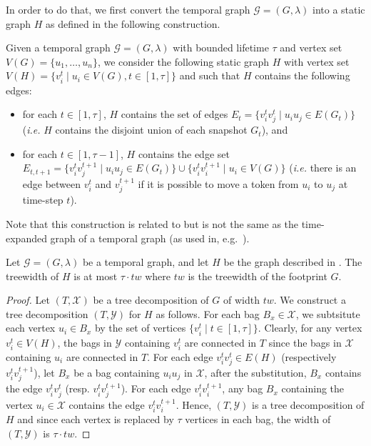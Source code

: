 In order to do that, we first convert the temporal graph $\mathcal{G}=(G,\lambda)$ into a static graph $H$ as defined in the following construction.



\begin{construction}
  \label{const:sliding}
  Given a temporal graph $\mathcal{G}=(G,\lambda)$ with bounded lifetime $\tau$ and vertex set $V(G) = \{u_1,\dots,u_n\}$, we consider the following static graph $H$ with vertex set $V(H) = \{ v^t_i \mid u_i \in V(G), t \in [1,\tau]\}$ and such that $H$ contains the following edges:%
  \begin{itemize}
    \item for each $t \in [1,\tau]$, $H$ contains the set of edges $E_t = \{ v^t_iv^t_j \mid u_iu_j \in E(G_t)\}$ (\textit{i.e.} $H$ contains the disjoint union of each snapshot $G_t$), and
    \item for each $t \in [1,\tau-1]$, $H$ contains the edge set $E_{t,t+1} = \{v^t_iv^{t+1}_j \mid u_iu_j \in E(G_t)\} \cup \{v^t_iv^{t+1}_i \mid u_i \in V(G)\}$ (\textit{i.e.} there is an edge between $v^t_i$ and $v^{t+1}_j$ if it is possible to move a token from $u_i$ to $u_j$ at time-step $t$).  
  \end{itemize}
\end{construction}
Note that this construction is related to but is not the same as the time-expanded graph of a temporal graph (as used in, e.g.~\cite{fluschnik_as_2020}).

\begin{lemmarep}
Let $\mathcal{G}=(G,\lambda)$ be a temporal graph, and let $H$ be the graph described in . The treewidth of $H$ is at most $\tau\cdot tw$ where $tw$ is the treewidth of the footprint $G$.
\end{lemmarep}
\begin{proof}
  Let $(T,\mathcal{X})$ be a tree decomposition of $G$ of width $tw$. We construct a tree decomposition $(T,\mathcal{Y})$ for $H$ as follows. For each bag $B_x \in \mathcal{X}$, we subtsitute each vertex $u_i \in B_x$ by the set of vertices $\{v^t_i \mid t \in [1,\tau]\}$. Clearly, for any vertex $v^t_i \in V(H)$, the bags in $\mathcal{Y}$ containing $v^t_i$ are connected in $T$ since the bags in $\mathcal{X}$ containing $u_i$ are connected in $T$.
For each edge $v^t_iv^t_j \in E(H)$ (respectively $v^t_iv^{t+1}_j$), let $B_x$ be a bag containing $u_iu_j$ in $\mathcal{X}$, after the substitution, $B_x$ contains the edge $v^t_iv^t_j$ (resp. $v^t_iv^{t+1}_j$). For each edge $v^t_iv^{t+1}_i$, any bag $B_x$ containing the vertex $u_i \in \mathcal{X}$ contains the edge $v^t_iv^{t+1}_i$. Hence, $(T,\mathcal{Y})$ is a tree decomposition of $H$ and since each vertex is replaced by $\tau$ vertices in each bag, the width of $(T,\mathcal{Y})$ is $\tau \cdot tw$.
\end{proof}
 

